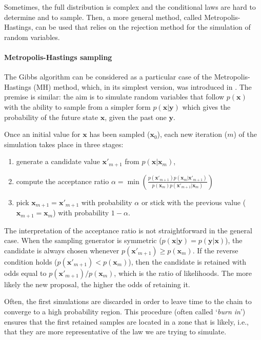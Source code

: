 Sometimes, the full distribution is complex and the conditional laws are hard to determine and to sample. Then, a more general method, called Metropolis-Hastings, can be used that relies on the rejection method for the simulation of random variables.

\paragraph{Metropolis-Hastings sampling}

The Gibbs algorithm can be considered as a particular case of the Metropolis-Hastings (MH) method, which, in its simplest version, was introduced in \cite{metropolis1949monte}. The premise is similar: the aim is to simulate random variables that follow $p(\textbf{x})$ with the ability to sample from a simpler form $p(\textbf{x}|\textbf{y})$ which gives the probability of the future state $\textbf{x}$, given the past one $\textbf{y}$.

Once an initial value for $\textbf{x}$ has been sampled ($\textbf{x}_0$), each new iteration ($m$) of the simulation takes place in three stages:

\begin{enumerate}
\item generate a candidate value $\textbf{x}'_{m+1}$ from $p(\textbf{x}|\textbf{x}_m)$,
\item compute the acceptance ratio $\alpha=\min\left(\frac{p(\textbf{x}'_{m+1})p(\textbf{x}_{m}|\textbf{x}'_{m+1})}{p(\textbf{x}_{m})p(\textbf{x}'_{m+1}|\textbf{x}_{m})} \right)$
\item pick $\textbf{x}_{m+1}=\textbf{x}'_{m+1}$ with probability $\alpha$ or stick with the previous value ($\textbf{x}_{m+1}=\textbf{x}_{m}$) with probability $1 -\alpha$.
\end{enumerate}

The interpretation of the acceptance ratio is not straightforward in the general case. When the sampling generator is symmetric ($p(\textbf{x}|\textbf{y})=p(\textbf{y}|\textbf{x})$), the candidate is always chosen whenever $p(\textbf{x}'_{m+1})\ge p(\textbf{x}_{m})$. If the reverse condition holds ($p(\textbf{x}'_{m+1})< p(\textbf{x}_{m})$), then the candidate is retained with odds equal to $p(\textbf{x}'_{m+1})/p(\textbf{x}_{m})$, which is the ratio of likelihoods. The more likely the new proposal, the higher the odds of retaining it.

Often, the first simulations are discarded in order to leave time to the chain to converge to a high probability region. This procedure (often called `\textit{burn in}') ensures that the first retained samples are located in a zone that is likely, i.e., that they are more representative of the law we are trying to simulate.

